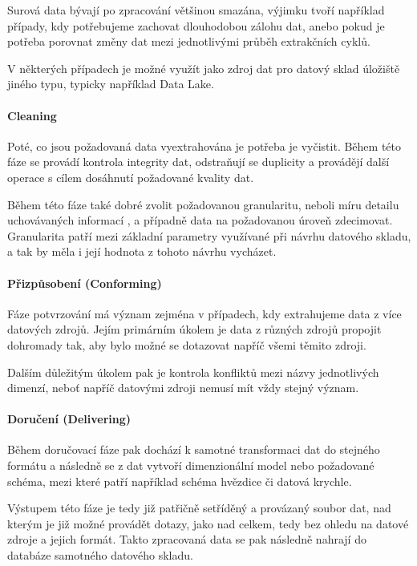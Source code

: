 \documentclass[
  digital,     %
  twoside,     %
  lof,         %
  lot,         %
]{fithesis4}
\begin{document}
Surová data bývají po zpracování většinou smazána, výjimku tvoří například případy,
kdy potřebujeme zachovat dlouhodobou zálohu dat, anebo pokud je potřeba porovnat změny dat mezi
jednotlivými průběh extrakčních cyklů.\parencite[s.~18]{Kimballc2004}

V některých případech je možné využít jako zdroj dat pro datový sklad úložiště jiného
typu, typicky například Data Lake.

\paragraph{Cleaning}
Poté, co jsou požadovaná data vyextrahována je potřeba je vyčistit. Během této fáze
se provádí kontrola integrity dat, odstraňují se duplicity a provádějí další operace s cílem
dosáhnutí požadované kvality dat.\parencite[s.~18-19]{Kimballc2004}

Během této fáze také dobré zvolit požadovanou granularitu, neboli míru detailu
uchovávaných informací \parencite[s.~41]{Inmon2005}, a případně data na požadovanou úroveň
zdecimovat. Granularita patří mezi základní parametry využívané při návrhu datového
skladu, a tak by měla i její hodnota z tohoto návrhu vycházet.\parencite[s.~41]{Inmon2005}

\paragraph{Přizpůsobení (Conforming)}
Fáze potvrzování má význam zejména v případech, kdy extrahujeme data z více
datových zdrojů. Jejím primárním úkolem je data z různých zdrojů propojit dohromady tak,
aby bylo možné se dotazovat napříč všemi těmito zdroji. \parencite[s.~19]{Kimballc2004}

Dalším důležitým úkolem pak je kontrola konfliktů mezi názvy jednotlivých dimenzí, neboť
napříč datovými zdroji nemusí mít vždy stejný význam. \parencite{Kimballc2004}

\paragraph{Doručení (Delivering)}
Během doručovací fáze pak dochází k samotné transformaci dat do stejného formátu a
následně se z dat vytvoří dimenzionální model nebo požadované schéma, mezi které patří například
schéma hvězdice či datová krychle.\parencite[s.~19]{Kimballc2004}

Výstupem této fáze je tedy již patřičně setříděný a provázaný soubor dat, nad kterým
je již možné provádět dotazy, jako nad celkem, tedy bez ohledu na datové zdroje a jejich
formát. Takto zpracovaná data se pak následně nahrají do databáze samotného datového
skladu.
\end{document}
